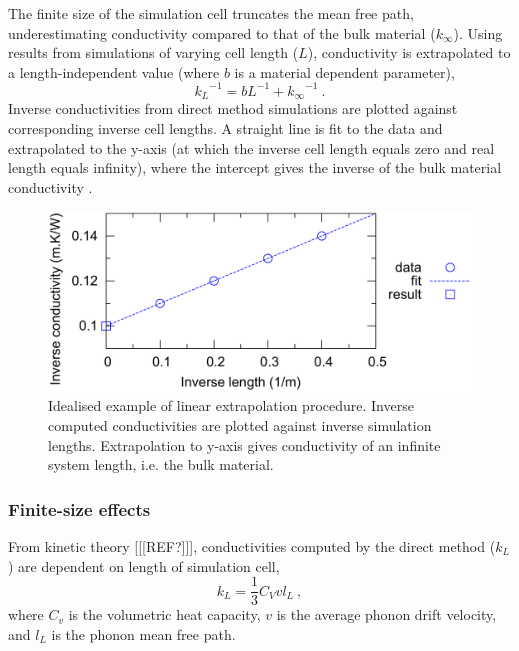 The finite size of the simulation cell truncates the mean free path, underestimating conductivity compared to that of the bulk material ($k_\infty$). Using results from simulations of varying cell length ($L$), conductivity is extrapolated to a length-independent value (where $b$ is a material dependent parameter),
%
\begin{equation}
{k_{L}}^{-1} = b L^{-1} + {k_{\infty}}^{-1}\ . 
\label{linear-extrap}
\end{equation}
%
Inverse conductivities from direct method simulations are plotted against corresponding inverse cell lengths. A straight line is fit to the data and extrapolated to the y-axis (at which the inverse cell length equals zero and real length equals infinity), where the intercept gives the inverse of the bulk material conductivity \citep{Schelling2002}.

\begin{figure}[h]
  \includegraphics[width=\linewidth]{Figures/ideal_extrap.png}
  \caption{Idealised example of linear extrapolation procedure. Inverse computed conductivities are plotted against inverse simulation lengths. Extrapolation to y-axis gives conductivity of an infinite system length, i.e. the bulk material.}
  \label{fig:ideal}
\end{figure}



\subsubsection{Finite-size effects}

From kinetic theory [[[REF?]]], conductivities computed by the direct method ($k_L$) are dependent on length of simulation cell,
%
\begin{equation}
k_{L} = \frac{1}{3} C_{V} v l_{L}\ ,
\label{length-dep}
\end{equation}
%
where $C_v$ is the volumetric heat capacity, $v$ is the average phonon drift velocity, and $l_L$ is the phonon mean free path. 

